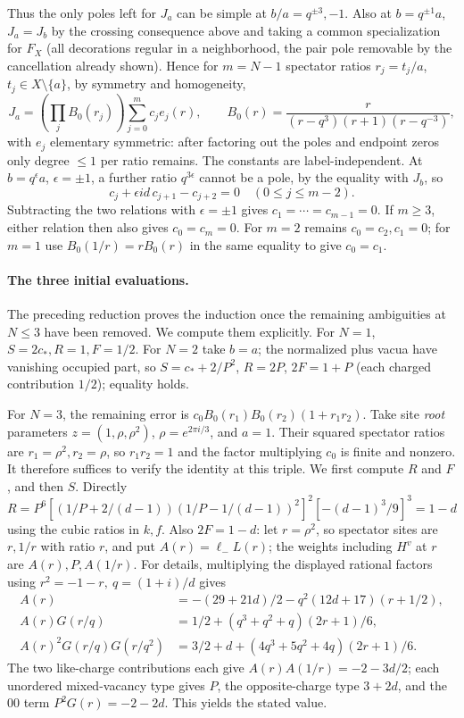 Thus the only poles left for \(J_a\) can be simple at \(b/a=q^{\pm3},-1\). Also at \(b=q^{\pm1}a\), \(J_a=J_b\) by the crossing consequence above and taking a common specialization for \(F_X\) (all decorations regular in a neighborhood, the pair pole removable by the cancellation already shown). Hence for \(m=N-1\) spectator ratios \(r_j=t_j/a\), \(t_j\in X\setminus\{a\}\), by symmetry and homogeneity,
\[
 J_a=\left(\prod_j B_0(r_j)\right)\sum_{j=0}^m c_j e_j(r),\qquad
 B_0(r)=\frac{r}{(r-q^3)(r+1)(r-q^{-3})},
\]
with \(e_j\) elementary symmetric: after factoring out the poles and endpoint zeros only degree \(\le1\) per ratio remains. The constants are label-independent. At \(b=q^\epsilon a\), \(\epsilon=\pm1\), a further ratio \(q^{3\epsilon}\) cannot be a pole, by the equality with \(J_b\), so
\[
                  c_j+\epsilon i d\,c_{j+1}-c_{j+2}=0\quad(0\le j\le m-2).
\]
Subtracting the two relations with $\epsilon=\pm1$ gives
$c_1=\cdots=c_{m-1}=0$. If $m\ge3$, either relation then also gives
$c_0=c_m=0$. For \(m=2\) remains \(c_0=c_2,c_1=0\); for \(m=1\) use \(B_0(1/r)=rB_0(r)\) in the same equality to give \(c_0=c_1\).

\paragraph{The three initial evaluations.}
The preceding reduction proves the induction once the remaining
ambiguities at \(N\le3\) have been removed. We compute them explicitly. For \(N=1\), \(S=2c_*,R=1,F=1/2\). For \(N=2\) take \(b=a\); the normalized plus vacua have vanishing occupied part, so \(S=c_*+2/P^2\), \(R=2P\), \(2F=1+P\) (each charged contribution \(1/2\)); equality holds.

For \(N=3\), the remaining error is
\(c_0B_0(r_1)B_0(r_2)(1+r_1r_2)\). Take site \emph{root} parameters
\(z=(1,\rho,\rho^2)\), \(\rho=e^{2\pi i/3}\), and \(a=1\). Their
squared spectator ratios are \(r_1=\rho^2,r_2=\rho\), so
\(r_1r_2=1\) and the factor multiplying \(c_0\) is finite and nonzero.
It therefore suffices to verify the identity at this triple. We first
compute \(R\) and \(F\), and then \(S\). Directly
\[
 R=P^6[(1/P+2/(d-1))(1/P-1/(d-1))^2]^2[-(d-1)^3/9]^3=1-d
\]
using the cubic ratios in \(k,f\). Also \(2F=1-d\): let \(r=\rho^2\), so spectator sites are \(r,1/r\) with ratio \(r\), and put \(A(r)=\ell_- L(r)\); the weights including \(H^v\) at \(r\) are \(A(r),P,A(1/r)\). For details, multiplying the displayed rational factors using \(r^2=-1-r,\ q=(1+i)/d\) gives
\[
 \begin{aligned}
 A(r)&=-(29+21d)/2-q^2(12d+17)(r+1/2),\\
 A(r)G(r/q)&=1/2+(q^3+q^2+q)(2r+1)/6,\\
 A(r)^2G(r/q)G(r/q^2)&=3/2+d+(4q^3+5q^2+4q)(2r+1)/6 .
 \end{aligned}
\]
The two like-charge contributions each give \(A(r)A(1/r)=-2-3d/2\); each unordered mixed-vacancy type gives \(P\), the opposite-charge type \(3+2d\), and the \(00\) term \(P^2G(r)=-2-2d\). This yields the stated value.


